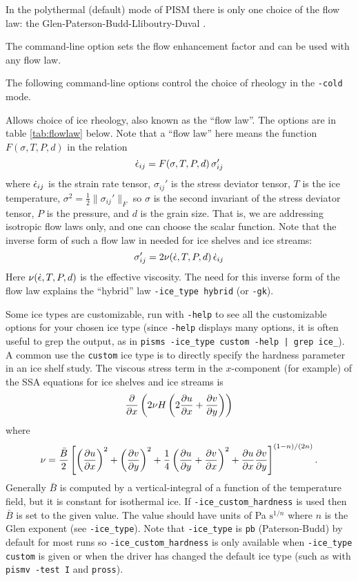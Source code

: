 In the polythermal (default) mode of PISM there is only one choice of the flow law: the Glen-Paterson-Budd-Lliboutry-Duval \cite{LliboutryDuval1985, AschwandenBlatter}. 

The command-line option  sets the flow enhancement factor and can be used with any flow law.

The following command-line options control the choice of rheology in the \texttt{-cold} mode.

  Allows choice of ice rheology, also known as the ``flow law''.  The options are in table \ref{tab:flowlaw} below.  Note that a ``flow law'' here means the function $F(\sigma,T,P,d)$ in the relation
	$$\dot {\epsilon}_{ij} = F(\sigma,T,P,d)\, \sigma_{ij}'$$
where $\dot {\epsilon}_{ij}$ is the strain rate tensor, $\sigma_{ij}'$ is the stress deviator tensor, $T$ is the ice temperature, $\sigma^2 = \frac{1}{2} \|\sigma_{ij}'\|_F$ so $\sigma$ is the second invariant of the stress deviator tensor, $P$ is the pressure, and $d$ is the grain size.  That is, we are addressing isotropic flow laws only, and one can choose the scalar function.  Note that the inverse form of such a flow law in needed for ice shelves and ice streams:
	$$\sigma_{ij}' = 2 \nu(\dot{\epsilon},T,P,d)\,\dot {\epsilon}_{ij} $$
Here $\nu(\dot {\epsilon},T,P,d)$ is the effective viscosity.  The need for this inverse form of the flow law explains the ``hybrid'' law \texttt{-ice_type hybrid} (or \texttt{-gk}).

 Some ice types are customizable, run with \texttt{-help} to see all the customizable options for your chosen ice type (since \texttt{-help} displays many options, it is often useful to grep the output, as in \verb:pisms -ice_type custom -help | grep ice_:).  A common use the \texttt{custom} ice type is to directly specify the hardness parameter in an ice shelf study.  The viscous stress term in the $x$-component (for example) of the SSA equations for ice shelves and ice streams is
	$$\frac{\partial }{\partial x}\left(2\nu H\left(2\frac{\partial u}{\partial x} + \frac{\partial v}{\partial y}\right)\right)$$
where 
	$$\nu = \frac{\bar B}{2} \left[\left(\frac{\partial u}{\partial x}\right)^2 + \left(\frac{\partial v}{\partial y}\right)^2 +
  \frac{1}{4} \left(\frac{\partial u}{\partial y} + \frac{\partial v}{\partial x}\right)^2 + \frac{\partial u}{\partial x}\frac{\partial v}{\partial y}\right]^{(1-n)/(2n)}.$$
Generally $\bar B$ is computed by a vertical-integral of a function of the temperature field, but it is constant for isothermal ice.  If \texttt{-ice_custom_hardness} is used then $\bar B$ is set to the given value.  The value should have units of Pa $\text{s}^{1/n}$ where $n$ is the Glen exponent (see \texttt{-ice_type}).  Note that \texttt{-ice_type} is \texttt{pb} (Paterson-Budd) by default for most runs so \texttt{-ice_custom_hardness} is only available when \texttt{-ice_type custom} is given or when the driver has changed the default ice type (such as with \texttt{pismv -test I} and \texttt{pross}).

